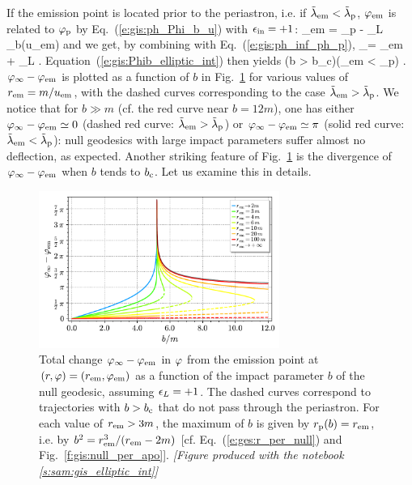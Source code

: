 If the emission point is located prior
to the periastron, i.e. if ${\tilde\lambda}_{\rm em} < {\tilde\lambda}_{\rm p}$,
$\varphi_{\rm em}$ is related to $\varphi_{\rm p}$
by Eq.~(\ref{e:gis:ph_Phi_b_u}) with $\epsilon_{\rm in} = +1$:
\be
    \ph_{\rm em} = \ph_{\rm p} - \eps_L \Phi_b(u_{\rm em})
\ee
and we get, by combining with Eq.~(\ref{e:gis:ph_inf_ph_p}),
\be
    \ph_\infty = \ph_{\rm em} + \eps_L  .
\ee
Equation~(\ref{e:gis:Phib_elliptic_int}) then yields
\be \label{e:gis:ph_inf_em_prior_per}
    \qquad
           {(b > b_{\rm c})\atop (\tlamb_{\rm em} < \tlamb_{\rm p})} .
\ee
$\varphi_\infty - \varphi_{\rm em}$ is plotted as a function of $b$ in Fig.~\ref{f:gis:phi_inf_em_b}
for various values of $r_{\rm em} = m / u_{\rm em}$, with the dashed curves
corresponding to the case ${\tilde\lambda}_{\rm em} > {\tilde\lambda}_{\rm p}$.
We notice that for $b \gg m$ (cf. the red curve near $b = 12 m$), one has
either $\varphi_\infty - \varphi_{\rm em} \simeq 0$ (dashed red curve: ${\tilde\lambda}_{\rm em} > {\tilde\lambda}_{\rm p}$)
or $\varphi_\infty - \varphi_{\rm em} \simeq \pi$ (solid red curve: ${\tilde\lambda}_{\rm em} < {\tilde\lambda}_{\rm p}$):
null geodesics with large impact parameters suffer almost no deflection,
as expected. Another striking feature of Fig.~\ref{f:gis:phi_inf_em_b}
is the divergence of $\varphi_\infty - \varphi_{\rm em}$ when $b$ tends to $b_{\rm c}$.
Let us examine this in details.

\begin{figure}
\centerline{\includegraphics[width=0.7\textwidth]{gis_phi_inf_em_b.pdf}}
\caption[]{\label{f:gis:phi_inf_em_b} \footnotesize
Total change $\varphi_\infty - \varphi_{\rm em}$ in $\varphi$ from the
emission point at $(r,\varphi) = (r_{\rm em}, \varphi_{\rm em})$
as a function of the impact parameter $b$ of the null geodesic, assuming $\epsilon_L = +1$.
The dashed curves correspond to trajectories with $b > b_{\rm c}$ that do not pass
through the periastron. For each value of $r_{\rm em} > 3m$, the maximum of
$b$ is given by $r_{\rm p}(b) = r_{\rm em}$, i.e. by
$b^2 = r_{\rm em}^3/(r_{\rm em} - 2 m)$ [cf. Eq.~(\ref{e:ges:r_per_null})
and Fig.~\ref{f:gis:null_per_apo}].
\textsl{[Figure produced with the notebook \ref{s:sam:gis_elliptic_int}]}
}
\end{figure}

